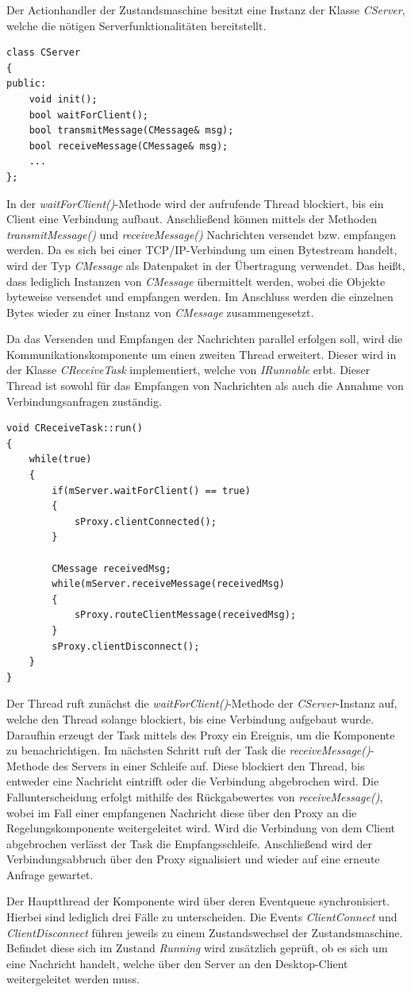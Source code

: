 Der Actionhandler der Zustandsmaschine besitzt eine Instanz der Klasse \textit{CServer}, welche die nötigen Serverfunktionalitäten bereitstellt.
\begin{lstlisting}[caption={Implementierung der Server-Klasse},captionpos=b]
class CServer
{
public:
	void init();
	bool waitForClient();
	bool transmitMessage(CMessage& msg);
	bool receiveMessage(CMessage& msg);
	...
};
\end{lstlisting}
In der \textit{waitForClient()}-Methode wird der aufrufende Thread blockiert, bis ein Client eine Verbindung aufbaut. Anschließend können mittels der Methoden \textit{transmitMessage()} und \textit{receiveMessage()} Nachrichten versendet bzw. empfangen werden. Da es sich bei einer TCP/IP-Verbindung um einen Bytestream handelt, wird der Typ \textit{CMessage} als Datenpaket in der Übertragung verwendet. Das heißt, dass lediglich Instanzen von \textit{CMessage} übermittelt werden, wobei die Objekte byteweise versendet und empfangen werden. Im Anschluss werden die einzelnen Bytes wieder zu einer Instanz von \textit{CMessage} zusammengesetzt.

Da das Versenden und Empfangen der Nachrichten parallel erfolgen soll, wird die Kommunikationskomponente um einen zweiten Thread erweitert. Dieser wird in der Klasse \textit{CReceiveTask} implementiert, welche von \textit{IRunnable} erbt. Dieser Thread ist sowohl für das Empfangen von Nachrichten als auch die Annahme von Verbindungsanfragen zuständig.
\begin{lstlisting}[caption={Implementierung des Receive-Tasks},captionpos=b]
void CReceiveTask::run()
{
	while(true)
	{
		if(mServer.waitForClient() == true)
		{
			sProxy.clientConnected();
		}
		
		CMessage receivedMsg;
		while(mServer.receiveMessage(receivedMsg)
		{
			sProxy.routeClientMessage(receivedMsg);
		}
		sProxy.clientDisconnect();
	}
}
\end{lstlisting}
Der Thread ruft zunächst die \textit{waitForClient()}-Methode der \textit{CServer}-Instanz auf, welche den Thread solange blockiert, bis eine Verbindung aufgebaut wurde. Daraufhin erzeugt der Task mittels des Proxy ein Ereignis, um die Komponente zu benachrichtigen. Im nächsten Schritt ruft der Task die \textit{receiveMessage()}-Methode des Servers in einer Schleife auf. Diese blockiert den Thread, bis entweder eine Nachricht eintrifft oder die Verbindung abgebrochen wird. Die Fallunterscheidung erfolgt mithilfe des Rückgabewertes von \textit{receiveMessage()}, wobei im Fall einer empfangenen Nachricht diese über den Proxy an die Regelungskomponente weitergeleitet wird. Wird die Verbindung von dem Client abgebrochen verlässt der Task die Empfangsschleife. Anschließend wird der Verbindungsabbruch über den Proxy signalisiert und wieder auf eine erneute Anfrage gewartet.

Der Hauptthread der Komponente wird über deren Eventqueue synchronisiert. Hierbei sind lediglich drei Fälle zu unterscheiden. Die Events \textit{ClientConnect} und \textit{ClientDisconnect} führen jeweils zu einem Zustandswechsel der Zustandsmaschine. Befindet diese sich im Zustand \textit{Running} wird zusätzlich geprüft, ob es sich um eine Nachricht handelt, welche über den Server an den Desktop-Client weitergeleitet werden muss.